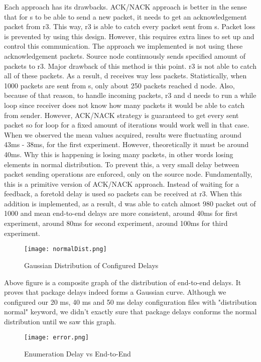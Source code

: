 \documentclass[conference]{IEEEtran}
\begin{document}
Each approach has its drawbacks. ACK/NACK approach is better in the sense that for s to be able to send a new packet, it needs to get an acknowledgement packet from r3. This way, r3 is able to catch every packet sent from s. Packet loss is prevented by using this design. However, this requires extra lines to set up and control this communication. The approach we implemented is not using these acknowledgement packets. Source node continuously sends specified amount of packets to r3. Major drawback of this method is this point. r3 is not able to catch all of these packets. As a result, d receives way less packets. Statistically, when 1000 packets are sent from s, only about 250 packets reached d node. Also, because of that reason, to handle incoming packets, r3 and d needs to run a while loop since receiver does not know how many packets it would be able to catch from sender. However, ACK/NACK strategy is guaranteed to get every sent packet so for loop for a fixed amount of iterations would work well in that case. When we observed the mean values acquired, results were fluctuating around 43ms - 38ms, for the first experiment. However, theoretically it must be around 40ms. Why this is happening is losing many packets, in other words losing elements in normal distribution. To prevent this, a very small delay between packet sending operations are enforced, only on the source node. Fundamentally, this is a primitive version of ACK/NACK approach. Instead of waiting for a feedback, a foretold delay is used so packets can be received at r3. When this addition is implemented, as a result, d was able to catch almost 980 packet out of 1000 and mean end-to-end delays are more consistent, around 40ms for first experiment, around 80ms for second experiment, around 100ms for third experiment.\\
\begin{figure}[htbp]
\centerline{\texttt{[image: normalDist.png]}}
\caption{Gaussian Distribution of Configured Delays}
\label{fig6}
\end{figure}

Above figure is a composite graph of the distribution of end-to-end delays. It proves that package delays indeed forms a Gaussian curve. Although we configured our 20 ms, 40 ms and 50 ms delay configuration files with "distribution normal" keyword, we didn't exactly sure that package delays conforms the normal distribution until we saw this graph.

\begin{figure}[htbp]
\centerline{\texttt{[image: error.png]}}
\caption{Enumeration Delay vs End-to-End}
\label{fig7}
\end{figure}
\end{document}
